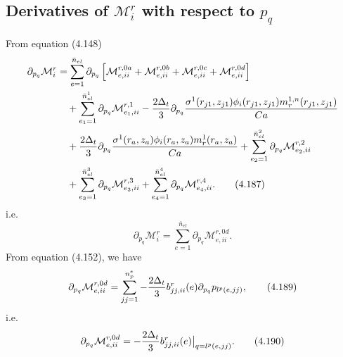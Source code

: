 \documentclass{article}
\begin{document}
\subsection{Derivatives of $\mathcal{M}_i^r$ with respect to $p_q$} %
From equation (4.148)
\begin{align}
\partial_{p_q}\mathcal{M}_i^r &= \sum_{e=1}^{\bar{n}_{el}} \partial_{p_q} \left[ \mathcal{M}_{e,ii}^{r,0a} + \mathcal{M}_{e,ii}^{r,0b} + \mathcal{M}_{e,ii}^{r,0c} + \mathcal{M}_{e,ii}^{r,0d} \right] \nonumber\\
&\quad + \sum_{e_1=1}^{\bar{n}_{el}^1} \partial_{p_q} \mathcal{M}_{e_1,ii}^{r,1} 
- \frac{2\Delta_t}{3} \partial_{p_q} \frac{\sigma^1(r_{j1},z_{j1}) \phi_i(r_{j1},z_{j1}) m_r^{1,n}(r_{j1},z_{j1})}{Ca} \nonumber\\
&\quad + \frac{2\Delta_t}{3} \partial_{p_q} \frac{\sigma^1(r_a,z_a) \phi_i(r_a,z_a) m_r^{1}(r_a,z_a)}{Ca} 
+ \sum_{e_2=1}^{\bar{n}_{el}^2} \partial_{p_q} \mathcal{M}_{e_2,ii}^{r,2} \nonumber\\
&\quad + \sum_{e_3=1}^{\bar{n}_{el}^3} \partial_{p_q} \mathcal{M}_{e_3,ii}^{r,3} 
+ \sum_{e_4=1}^{\bar{n}_{el}^4} \partial_{p_q} \mathcal{M}_{e_4,ii}^{r,4}. \tag{4.187}
\end{align}
i.e.
\begin{equation}
\partial_{p_q}\mathcal{M}_i^r = \sum_{e=1}^{\bar{n}_{el}} \partial_{p_q} \mathcal{M}_{e,ii}^{r,0d}. \tag{4.188}
\end{equation}
From equation (4.152), we have
\begin{equation}
\partial_{p_q}\mathcal{M}_{e,ii}^{r,0d} = \sum_{jj=1}^{n_p^e} -\frac{2\Delta_t}{3} b_{jj,ii}^r(e) \partial_{p_q} p_{l^p(e,jj)}, \tag{4.189}
\end{equation}
i.e.
\begin{equation}
\partial_{p_q}\mathcal{M}_{e,ii}^{r,0d} = -\frac{2\Delta_t}{3} b_{jj,ii}^r(e) \big|_{q=l^p(e,jj)}. \tag{4.190}
\end{equation}
\end{document}
